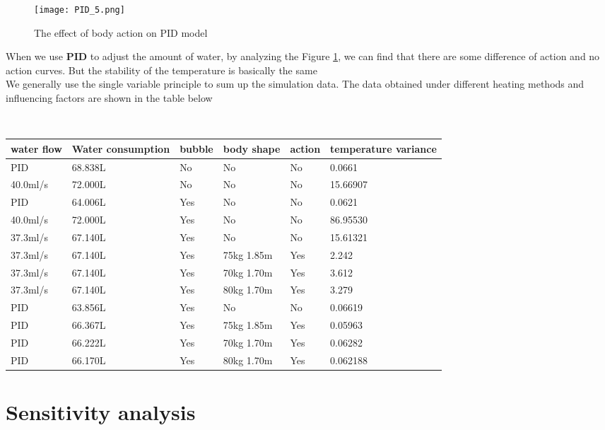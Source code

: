 \documentclass{mcmthesis}
\begin{document}
\begin{figure}[H]
	\centerline{\texttt{[image: PID\_5.png]}}
	\caption{The effect of body action on PID model}
	\label{action_pid}	
\end{figure}
When we use \textbf{PID} to adjust the amount of water, by analyzing the Figure \ref{action_pid}, we can find that there are some difference of action and no action curves. But the stability of the temperature is basically the same\\
\indent We generally use the single variable principle to sum up the simulation data. The data obtained under different heating methods and influencing factors are shown in the table below 
\begin{table}[H]
	\setlength{\abovecaptionskip}{0pt}
	\setlength{\belowcaptionskip}{0pt}
	\\
	\begin{tabular}{p{2cm}|p{2cm}|p{1.5cm}|p{3cm}|p{1cm}|p{2cm}}
		\hline
		\rowcolor[gray]{0.9}\bf{water flow}	&\bf{Water consumption} &\bf{bubble}&\bf{body shape}&\bf{action}&\bf{temperature variance} \\
		\hline
		PID 	 & 68.838L &No  &No &No &0.0661\\
		40.0ml/s   & 72.000L &No  &No &No &15.66907\\
		\hline
		PID 	 & 64.006L &Yes &No &No &0.0621\\
		40.0ml/s   & 72.000L &Yes &No &No &86.95530\\
		\hline
		37.3ml/s & 67.140L &Yes &No &No &15.61321\\
		37.3ml/s & 67.140L &Yes &75kg 1.85m &Yes &2.242\\	
		37.3ml/s & 67.140L &Yes &70kg 1.70m &Yes &3.612\\
		37.3ml/s & 67.140L &Yes &80kg 1.70m &Yes &3.279\\
		\hline
		PID & 63.856L &Yes &No &No &0.06619\\
		PID & 66.367L &Yes &75kg 1.85m &Yes &0.05963\\	
		PID & 66.222L &Yes &70kg 1.70m &Yes &0.06282\\
		PID & 66.170L &Yes &80kg 1.70m &Yes &0.062188\\
		\hline
	\end{tabular}
\end{table}

\section{Sensitivity analysis}
\end{document}
